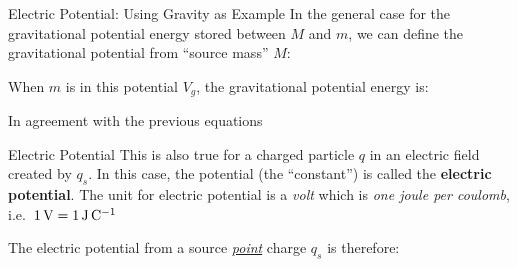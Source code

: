 \documentclass[12pt,aspectratio=169]{beamer}
\begin{document}
\begin{frame}{Electric Potential: Using Gravity as Example}
  In the general case for the gravitational potential energy stored between
  $M$ and $m$, we can define the gravitational potential from ``source mass''
  $M$:
  

  When $m$ is in this potential $V_g$, the gravitational potential energy is:


  In agreement with the previous equations
\end{frame}



\begin{frame}{Electric Potential}
  This is also true for a charged particle $q$ in an electric field
  created by $q_s$. In this case, the potential (the ``constant'') is called the
  \textbf{electric potential}. The unit for electric potential is a \emph{volt}
  which is \emph{one joule per coulomb}, i.e.\
  $\SI1\volt=\SI1{\joule\per\coulomb}$


  The electric potential from a source \underline{\emph{point}} charge $q_s$ is
  therefore:

\end{frame}
\end{document}
